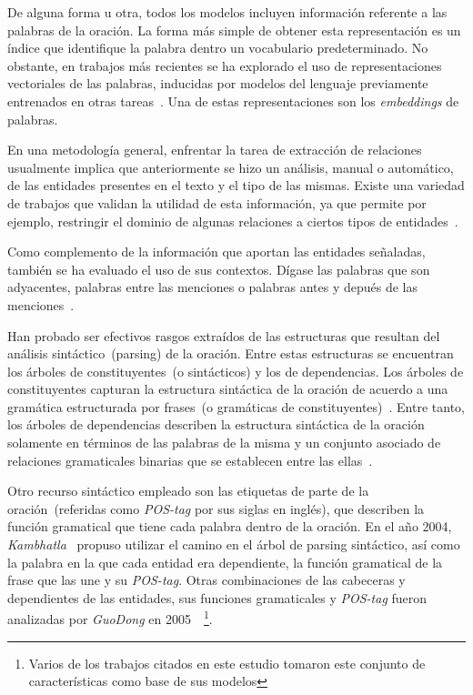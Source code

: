 De alguna forma u otra, todos los modelos incluyen información referente a las palabras de la oración.
La forma más simple de obtener esta representación es un índice que identifique la palabra dentro un vocabulario predeterminado.
No obstante, en trabajos más recientes se ha explorado el uso de representaciones vectoriales de las palabras, inducidas por modelos del lenguaje previamente entrenados en otras tareas~\cite{nguyen2014employing}.
Una de estas representaciones son los \textit{embeddings} de palabras.

En una metodología general, enfrentar la tarea de extracción de relaciones usualmente implica que anteriormente se hizo un análisis, manual o automático, de las entidades presentes en el texto y el tipo de las mismas. 
Existe una variedad de trabajos que validan la utilidad de esta información, ya que permite por ejemplo, restringir el dominio de algunas relaciones a ciertos tipos de entidades~\cite{kambhatla2004combining, boschee2005automatic, guodong2005exploring, jiang2007systematic, chan2010exploiting}.

Como complemento de la información que aportan las entidades señaladas, también se ha evaluado el uso de sus contextos.
Dígase las palabras que son adyacentes, palabras entre las menciones o palabras antes y depués de las menciones~\cite{guodong2005exploring, chan2010exploiting, sun2011semi, nguyen2014employing}.

Han probado ser efectivos rasgos extraídos de las estructuras que resultan del análisis sintáctico~(parsing) de la oración.
Entre estas estructuras se encuentran los árboles de constituyentes~(o sintácticos) y los de dependencias.
Los árboles de constituyentes capturan la estructura sintáctica de la oración de acuerdo a una gramática estructurada por frases~(o gramáticas de constituyentes)~\cite{chomsky2002syntactic}.
Entre tanto, los árboles de dependencias describen la estructura sintáctica de la oración solamente en términos de las palabras de la misma y un conjunto asociado de relaciones gramaticales binarias que se establecen entre las ellas~\cite{tesniere2015elements}.

Otro recurso sintáctico empleado son las etiquetas de parte de la oración~(referidas como \textit{POS-tag} por sus siglas en inglés), que describen la función gramatical que tiene cada palabra dentro de la oración.
En el año 2004, \textit{Kambhatla}~\cite{kambhatla2004combining} propuso utilizar el camino en el árbol de parsing sintáctico, así como la palabra en la que cada entidad era dependiente, la función gramatical de la frase que las une y su \textit{POS-tag}.
Otras combinaciones de las cabeceras y dependientes de las entidades, sus funciones gramaticales y \textit{POS-tag} fueron analizadas por \textit{GuoDong} en 2005~\cite{guodong2005exploring}~\footnote{Varios de los trabajos citados en este estudio tomaron este conjunto de características como base de sus modelos}.


